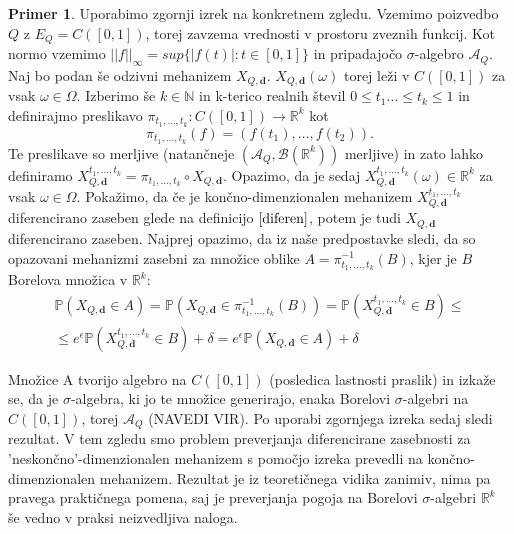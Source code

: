\documentclass[12pt,a4paper]{amsart}
\theoremstyle{definition} %
\newtheorem{primer}[definicija]{Primer}
\theoremstyle{plain} %
\begin{document}
\begin{primer}
Uporabimo zgornji izrek na konkretnem zgledu. Vzemimo poizvedbo $Q$ z $E_Q = C([0,1])$, torej zavzema vrednosti v prostoru zveznih funkcij. Kot normo vzemimo $||f||_\infty = sup\{|f(t)| : t \in [0,1]\}$ in pripadajočo $\sigma$-algebro $\mathcal{A}_Q$. Naj bo podan še odzivni mehanizem $X_{Q,\textbf{d}}$. $X_{Q,\textbf{d}}(\omega)$ torej leži v $C([0,1])$ za vsak $\omega \in \Omega$.
\newline
Izberimo še $k \in \mathbb{N}$ in k-terico realnih števil $0 \leq t_1 \ldots \leq t_k \leq 1$ in definirajmo preslikavo $ \pi _{t_1,\ldots,t_k}: C([0,1]) \rightarrow \mathbb{R}^k$ kot $$\pi _{t_1,\ldots,t_k}(f) = (f(t_1),\ldots,f(t_2)).$$ Te preslikave so merljive (natančneje $(\mathcal{A}_Q, \mathcal{B}(\mathbb{R}^k))$ merljive) in zato lahko definiramo $X_{Q,\textbf{d}}^{t_1,\ldots,t_k} = \pi _{t_1,\ldots,t_k} \circ X_{Q,\textbf{d}}$. Opazimo, da je sedaj $X_{Q,\textbf{d}}^{t_1,\ldots,t_k} (\omega) \in \mathbb{R}^k$ za vsak $\omega \in \Omega$. Pokažimo, da če je končno-dimenzionalen mehanizem $X_{Q,\textbf{d}}^{t_1,\ldots,t_k}$ diferencirano zaseben glede na definicijo $\eqref{diferen}$, potem je tudi $X_{Q,\textbf{d}}$ diferencirano zaseben. Najprej opazimo, da iz naše predpostavke sledi, da so opazovani mehanizmi zasebni za množice oblike $A = \pi _{t_1,\ldots,t_k}^{-1}(B)$, kjer je $B$ Borelova množica v $\mathbb{R}^k$: 
\begin{equation*}
\begin{split}
\mathbb{P}(X_{Q,\textbf{d}} \in A) =  \mathbb{P}(X_{Q,\textbf{d}} \in \pi _{t_1,\ldots,t_k}^{-1}(B)) = \mathbb{P}(X_{Q,\textbf{d}}^{t_1,\ldots,t_k} \in B) \leq \\
 \leq e^{\epsilon}\mathbb{P}(X_{Q,\textbf{d}}^{t_1,\ldots,t_k} \in B) + \delta = e^{\epsilon}\mathbb{P}(X_{Q,\textbf{d}} \in A) + \delta
\end{split}
\end{equation*}


Množice A tvorijo algebro na $C([0,1])$ (posledica lastnosti praslik) in izkaže se, da je $\sigma$-algebra, ki jo te množice generirajo, enaka  Borelovi $\sigma$-algebri na $C([0,1])$, torej $\mathcal{A}_Q$ (NAVEDI VIR). Po uporabi zgornjega izreka sedaj sledi rezultat.
\newline
\newline
V tem zgledu smo problem preverjanja diferencirane zasebnosti za 'neskončno'-dimenzionalen mehanizem s pomočjo izreka prevedli na končno-dimenzionalen mehanizem. Rezultat je iz teoretičnega vidika zanimiv, nima pa pravega praktičnega pomena, saj je preverjanja pogoja na Borelovi $\sigma$-algebri $\mathbb{R}^k$ še vedno v praksi neizvedljiva naloga.
\end{primer}
\end{document}
